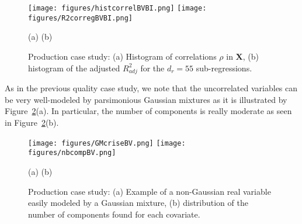 \documentclass[11pt,a4paper]{article}
\begin{document}
\begin{figure}[h!]
\begin{center}
			\texttt{[image: figures/histcorrelBVBI.png]}
			\texttt{[image: figures/R2corregBVBI.png]}
\end{center}
\vspace{-5mm}
			\centerline{(a) \hspace{130px} (b)}
			\caption{Production case study: (a) Histogram of correlations $\rho$ in $\boldsymbol{X}$, (b) histogram of the adjusted $R^2_{adj}$ for the $d_r=55$ sub-regressions.}\label{fig:graphCorr.production}
\end{figure}  	

\vspace{3mm}

As in the previous quality case study, we note that the uncorrelated variables can be very well-modeled by parsimonious Gaussian mixtures as it is illustrated by Figure~\ref{fig:graphMixmod.production}(a). In particular, the number of components is really moderate as seen in Figure~\ref{fig:graphMixmod.production}(b).

\vspace{3mm}

		\begin{figure}[h!]
\begin{center}
			\texttt{[image: figures/GMcriseBV.png]}
			\texttt{[image: figures/nbcompBV.png]}
\end{center}
\vspace{-5mm}
			\centerline{(a) \hspace{130px} (b)}
			\caption{Production case study: (a) Example of a non-Gaussian real variable easily modeled by a Gaussian mixture, (b) distribution of the number of components found for each covariate.}\label{fig:graphMixmod.production}
\end{figure}  	

		
		
%  		
  			
\end{document}
